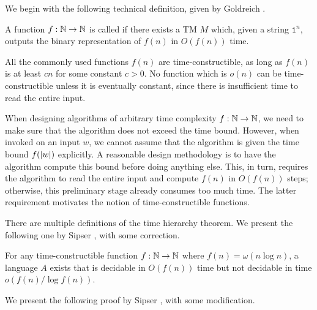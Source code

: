 \documentclass[11pt,twoside=off,numbers=noenddot]{scrbook}
\begin{document}
We begin with the following technical definition, given by Goldreich \cite{goldreich2008computational}.

\begin{definition}
  A function $f : \mathbb N \to \mathbb N$ is called  if there exists a TM $M$ which, given a string $\texttt{1}^n$, outputs the binary representation of $f(n)$ in $O(f(n))$ time.
\end{definition}

\begin{example}
  All the commonly used functions $f(n)$ are time-constructible, as long as $f(n)$ is at least $c n$ for some constant $c > 0$. No function which is $o(n)$ can be time-constructible unless it is eventually constant, since there is insufficient time to read the entire input.
\end{example}

When designing algorithms of arbitrary time complexity $f : \mathbb N \to \mathbb N$, we need to make sure that the algorithm does not exceed the time bound. However, when invoked on an input $w$, we cannot assume that the algorithm is given the time bound $f(| w |)$ explicitly. A reasonable design methodology is to have the algorithm compute this bound before doing anything else. This, in turn, requires the algorithm to read the entire input and compute $f(n)$ in $O(f(n))$ steps; otherwise, this preliminary stage already consumes too much time. The latter requirement motivates the notion of time-constructible functions.

There are multiple definitions of the time hierarchy theorem. We present the following one by Sipser \cite{sipser2013introduction}, with some correction.

\begin{theorem}
  For any time-constructible function $f : \mathbb N \to \mathbb N$ where $f(n) = \omega(n \log n)$, a language $A$ exists that is decidable in $O(f(n))$ time but not decidable in time $o(f(n) / \log f(n))$.
\end{theorem}

We present the following proof by Sipser \cite{sipser2013introduction}, with some modification.
\end{document}
